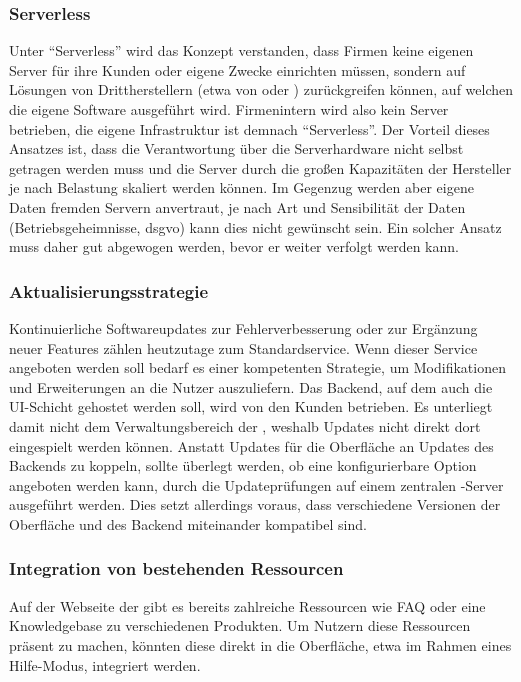 \subsubsection{Serverless}
Unter ``Serverless'' wird das Konzept verstanden, dass Firmen keine eigenen Server für ihre Kunden oder eigene Zwecke einrichten müssen, sondern auf Lösungen von Drittherstellern (etwa  von  oder ) zurückgreifen können, auf welchen die eigene Software ausgeführt wird. Firmenintern wird also kein Server betrieben, die eigene Infrastruktur ist demnach ``Serverless''. Der Vorteil dieses Ansatzes ist, dass die Verantwortung über die Serverhardware nicht selbst getragen werden muss und die Server durch die großen Kapazitäten der Hersteller je nach Belastung skaliert werden können. Im Gegenzug werden aber eigene Daten fremden Servern anvertraut, je nach Art und Sensibilität der Daten (Betriebsgeheimnisse, \gls{dsgvo}) kann dies nicht gewünscht sein. Ein solcher Ansatz muss daher gut abgewogen werden, bevor er weiter verfolgt werden kann.

\subsubsection{Aktualisierungsstrategie}
Kontinuierliche Softwareupdates zur Fehlerverbesserung oder zur Ergänzung neuer Features zählen heutzutage zum Standardservice. Wenn dieser Service angeboten werden soll bedarf es einer kompetenten Strategie, um Modifikationen und Erweiterungen an die Nutzer auszuliefern. Das Backend, auf dem auch die UI-Schicht gehostet werden soll, wird von den Kunden betrieben. Es unterliegt damit nicht dem Verwaltungsbereich der , weshalb Updates nicht direkt dort eingespielt werden können. Anstatt Updates für die Oberfläche an Updates des Backends zu koppeln, sollte überlegt werden, ob eine konfigurierbare Option angeboten werden kann, durch die Updateprüfungen auf einem zentralen -Server ausgeführt werden. Dies setzt allerdings voraus, dass verschiedene Versionen der Oberfläche und des Backend miteinander kompatibel sind. 

\subsubsection{Integration von bestehenden Ressourcen}
Auf der Webseite der  gibt es bereits zahlreiche Ressourcen wie FAQ oder eine Knowledgebase zu verschiedenen Produkten. Um Nutzern diese Ressourcen präsent zu machen, könnten diese direkt in die Oberfläche, etwa im Rahmen eines Hilfe-Modus, integriert werden.

